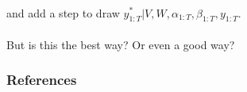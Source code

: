 \documentclass[xcolor=dvipsnames]{beamer}
\begin{document}
\begin{frame}
\begin{align*}
\end{align*}
and add a step to draw $y_{1:T}^*|V,W,\alpha_{1:T},\beta_{1:T},y_{1:T}$.\\~\\

But is this the best way? Or even a good way?
\end{frame}

\begin{frame}[allowframebreaks]
        \frametitle{References}
        
        
\end{frame} 
\end{document}
